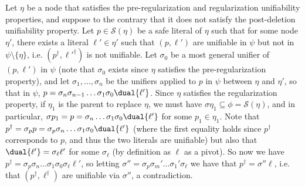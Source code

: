 Let $\eta$ be a node that satisfies the pre-regularization and regularization unifiability properties, and suppose to the contrary that it does not satisfy  the post-deletion unifiability property. 
Let $p\in \mathcal{S}(\eta)$ be a safe literal of $\eta$ such that for some node $\eta'$, there exists a literal $\ell' \in \eta'$ such that $(p,\ell')$ are unifiable in $\psi$ but not in $\psi\setminus\{\eta\}$, i.e. $(p^\dagger,\ell'^\dagger)$ is not unifiable. Let $\sigma_0$ be a most general unifier of $(p,\ell')$ in $\psi$ (note that $\sigma_0$ exists since $\eta$ satisfies the pre-regularization property), and let $\sigma_1,\ldots,\sigma_n$ be the unifiers applied to $p$ in $\psi$ between $\eta$ and $\eta'$, so that in $\psi$, $p=\sigma_n\sigma_{n-1}\ldots\sigma_1\sigma_0\dual{\ell'}$. Since $\eta$ satisfies the regularization property, if $\eta_1$ is the parent to replace $\eta$, we must have $\sigma\eta_1\subseteq \phi = \mathcal{S}(\eta)$, and in particular, $\sigma p_1 = p = \sigma_n\ldots\sigma_1\sigma_0\dual{\ell'}$ for some $p_1\in \eta_1$. 
Note that $p^\dagger = \sigma_p p = \sigma_p\sigma_n\ldots\sigma_1\sigma_0\dual{\ell'}$ (where the first equality holds since $p^\dagger$ corresponds to $p$, and thus the two literals are unifiable) but also that $\dual{\ell'} = \sigma_\ell\ell'$ for some $\sigma_\ell$ (by definition as $\ell$ as a pivot). So now we have $p^\dagger =  \sigma_p\sigma_n\ldots\sigma_1\sigma_0\sigma_\ell\ell'$, so letting $\sigma''=\sigma_p\sigma_m'\ldots\sigma_1'\sigma_\ell$ we have that $p^\dagger = \sigma'' \ell$, i.e. that $(p^\dagger,\ell^\dagger)$ are unifiable via $\sigma''$, a contradiction.





